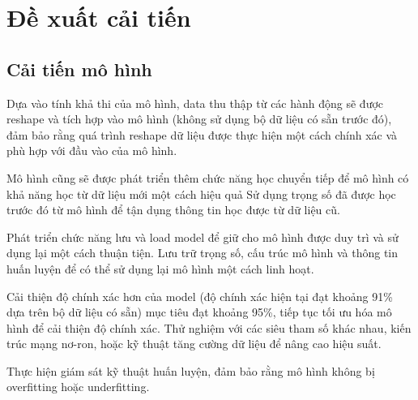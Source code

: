 \section{Đề xuất cải tiến}
\subsection{Cải tiến mô hình}

\incident Dựa vào tính khả thi của mô hình, data thu thập từ các hành động sẽ được reshape và tích hợp vào mô hình (không sử dụng bộ dữ liệu có sẵn trước đó), đảm bảo rằng quá trình reshape dữ liệu được thực hiện một cách chính xác và phù hợp với đầu vào của mô hình. 

\incident Mô hình cũng sẽ được phát triển thêm chức năng học chuyển tiếp để mô hình có khả năng học từ dữ liệu mới một cách hiệu quả Sử dụng trọng số đã được học trước đó từ mô hình để tận dụng thông tin học được từ dữ liệu cũ.

\incident Phát triển chức năng lưu và load model để giữ cho mô hình được duy trì và sử dụng lại một cách thuận tiện. Lưu trữ trọng số, cấu trúc mô hình và thông tin huấn luyện để có thể sử dụng lại mô hình một cách linh hoạt.

\incident Cải thiện độ chính xác hơn của model (độ chính xác hiện tại đạt khoảng 91\% dựa trên bộ dữ liệu có sẵn) mục tiêu đạt khoảng 95\%, tiếp tục tối ưu hóa mô hình để cải thiện độ chính xác. Thử nghiệm với các siêu tham số khác nhau, kiến trúc mạng nơ-ron, hoặc kỹ thuật tăng cường dữ liệu để nâng cao hiệu suất.


\incident Thực hiện giám sát kỹ thuật huấn luyện, đảm bảo rằng mô hình không bị overfitting hoặc underfitting.

